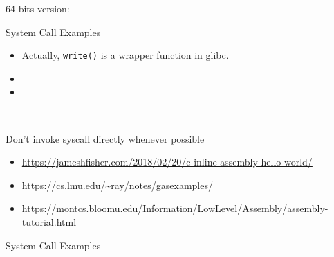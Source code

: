 64-bits version:

\begin{frame}{System Call Examples}
  \begin{minipage}{.55\linewidth}
  \end{minipage}\quad
  \begin{minipage}{.4\linewidth}\ttfamily\footnotesize
    \begin{itemize}
    \item Actually, \texttt{write()} is a wrapper function in glibc.
    \item[] 
    \item[] 
    \end{itemize}
  \end{minipage}\\[1em]
  \begin{description}
  \item[Don't invoke syscall directly whenever possible]
  \end{description}
\end{frame}

\begin{itemize}
\item \url{https://jameshfisher.com/2018/02/20/c-inline-assembly-hello-world/}
\item \url{https://cs.lmu.edu/~ray/notes/gasexamples/}
\item \url{https://montcs.bloomu.edu/Information/LowLevel/Assembly/assembly-tutorial.html}
\end{itemize}

\begin{frame}{System Call Examples}
  \begin{center}
  \end{center}
\end{frame}

\begin{frame}
  \begin{center}
  \end{center}
\end{frame}

